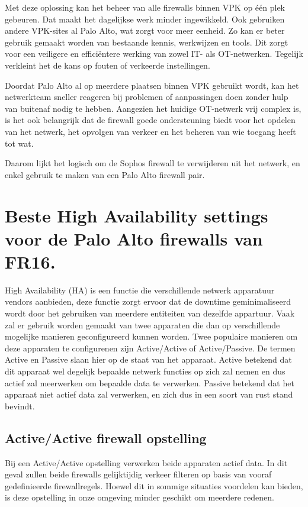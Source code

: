 Met deze oplossing kan het beheer van alle firewalls binnen VPK op één plek gebeuren. Dat maakt het dagelijkse werk minder ingewikkeld. Ook gebruiken andere VPK-sites al Palo Alto, wat zorgt voor meer eenheid. Zo kan er beter gebruik gemaakt worden van bestaande kennis, werkwijzen en tools. Dit zorgt voor een veiligere en efficiëntere werking van zowel IT- als OT-netwerken. Tegelijk verkleint het de kans op fouten of verkeerde instellingen.

Doordat Palo Alto al op meerdere plaatsen binnen VPK gebruikt wordt, kan het netwerkteam sneller reageren bij problemen of aanpassingen doen zonder hulp van buitenaf nodig te hebben. Aangezien het huidige OT-netwerk vrij complex is, is het ook belangrijk dat de firewall goede ondersteuning biedt voor het opdelen van het netwerk, het opvolgen van verkeer en het beheren van wie toegang heeft tot wat.

Daarom lijkt het logisch om de Sophos firewall te verwijderen uit het netwerk, en enkel gebruik te maken van een Palo Alto firewall pair.

\newpage

\section{Beste High Availability settings voor de Palo Alto firewalls van FR16.}


High Availability (HA) is een functie die verschillende netwerk apparatuur vendors aanbieden, deze functie zorgt ervoor dat de downtime geminimaliseerd wordt door het gebruiken van meerdere entiteiten van dezelfde appartuur. Vaak zal er gebruik worden gemaakt van twee apparaten die dan op verschillende mogelijke manieren geconfigureerd kunnen worden. Twee populaire manieren om deze apparaten te configurenen zijn Active/Active of Active/Passive. De termen Active en Passive slaan hier op de staat van het apparaat. Active betekend dat dit apparaat wel degelijk bepaalde netwerk functies op zich zal nemen en dus actief zal meerwerken om bepaalde data te verwerken. Passive betekend dat het apparaat niet actief data zal verwerken, en zich dus in een soort van rust stand bevindt.

\subsection{Active/Active firewall opstelling}
Bij een Active/Active opstelling verwerken beide apparaten actief data. In dit geval zullen beide firewalls gelijktijdig verkeer filteren op basis van vooraf gedefinieerde firewallregels. Hoewel dit in sommige situaties voordelen kan bieden, is deze opstelling in onze omgeving minder geschikt om meerdere redenen.
\newline



